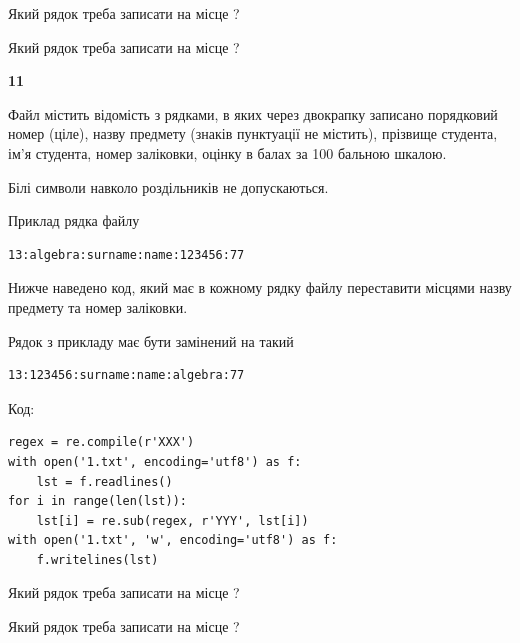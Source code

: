 Який рядок треба записати на місце  ?\par
\vspace{5mm}


Який рядок треба записати на місце  ?\par


\newpage

{\begin {center}\textbf{ 11}\end {center}}\par
Файл  містить відомість з рядками, в яких через двокрапку записано поряд\-ковий номер (ціле), назву предмету (знаків пунктуації не містить), прізвище студента, ім'я студента, номер заліковки, оцінку в балах за 100 бальною шкалою.

Білі символи навколо роздільників не допускаються.

Приклад рядка файлу



\begin{verbatim}
13:algebra:surname:name:123456:77
\end{verbatim}


Нижче наведено код, який має в кожному рядку файлу переставити місцями назву предмету та номер заліковки.

Рядок з прикладу має бути замінений на такий



\begin{verbatim}
13:123456:surname:name:algebra:77
\end{verbatim}




Код:



\begin{verbatim}
regex = re.compile(r'XXX')
with open('1.txt', encoding='utf8') as f:
    lst = f.readlines()
for i in range(len(lst)):
    lst[i] = re.sub(regex, r'YYY', lst[i])
with open('1.txt', 'w', encoding='utf8') as f:
    f.writelines(lst)
\end{verbatim}







Який рядок треба записати на місце  ?\par
\vspace{5mm}


Який рядок треба записати на місце  ?\par


